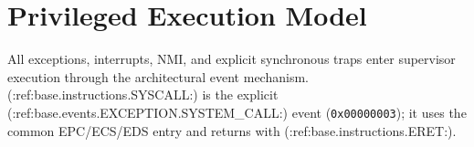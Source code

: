 \clearpage
\section{Privileged Execution Model}\label{page:privileged-execution-model}

All exceptions, interrupts, NMI, and explicit synchronous traps enter supervisor execution through the architectural event mechanism. (:ref:base.instructions.SYSCALL:) is the explicit (:ref:base.events.EXCEPTION.SYSTEM_CALL:) event (\texttt{0x00000003}); it uses the common EPC/ECS/EDS entry and returns with (:ref:base.instructions.ERET:).
